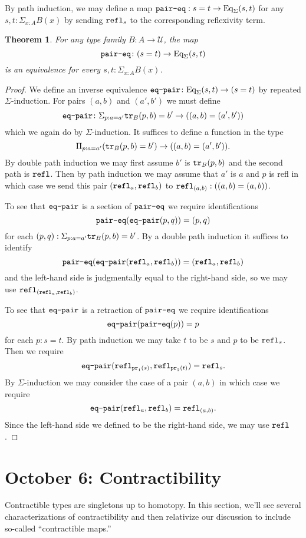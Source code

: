 \documentclass{amsart}
\theoremstyle{theorem}
\newtheorem*{thm}{Theorem}
\theoremstyle{definition}
\theoremstyle{remark}
\newcommand{\0}{\mathbbe{0}}
\newcommand{\1}{\mathbbe{1}}
\newcommand{\2}{\mathbbe{2}}
\newcommand{\3}{\mathbbe{3}}
\newcommand{\4}{\mathbbe{4}}
\newcommand{\term}[1]{{\textup{\texttt{#1}}}}
\newcommand{\pr}{\term{pr}}
\newcommand{\refl}{\term{refl}}
\newcommand{\tr}{\term{tr}}
\newcommand{\UU}{{\mathcal{U}}}
\newcommand{\Eq}{\textup{\text{Eq}}}
\begin{document}
By path induction, we may define a map $\term{pair-eq} : s =t \to \Eq_\Sigma(s,t)$ for any $s,t : \Sigma_{x:A}B(x)$ by sending $\refl_s$ to the corresponding reflexivity term.

\begin{thm} For any type family $B \colon A \to \UU$, the map
\[ \term{pair-eq} \colon (s=t) \to \Eq_\Sigma(s,t)\]
is an equivalence for every $s,t : \Sigma_{x:A}B(x)$.
\end{thm}
\begin{proof}
We define an inverse equivalence $\term{eq-pair} \colon \Eq_\Sigma(s,t) \to (s=t)$ by repeated $\Sigma$-induction. For pairs $(a,b)$ and $(a',b')$ we must define
\[ \term{eq-pair} \colon \Sigma_{p : a =a'} \tr_B(p,b)=b' \to ((a,b) = (a',b'))\]
which we again do by $\Sigma$-induction. It suffices to  define a function in the type
\[ \Pi_{p: a = a'} (\tr_B(p,b) = b') \to ((a,b)= (a',b')).\]
By double path induction we may first assume $b'$ is $\tr_B(p,b)$ and the second path is $\refl$. Then by path induction we may assume that $a'$ is $a$ and $p$ is refl in which case we send this pair $(\refl_a,\refl_b)$ to $\refl_{(a,b)} : ((a,b) = (a,b))$.

To see that $\term{eq-pair}$ is a section of $\term{pair-eq}$ we require identifications
\[ \term{pair-eq}(\term{eq-pair}(p,q)) = (p,q)\]
for each $(p,q) : \Sigma_{p : a=a'}\tr_B(p,b)=b'$. By a double path induction it suffices to identify
\[ \term{pair-eq}(\term{eq-pair}(\refl_a,\refl_b)) = (\refl_a,\refl_b)\] and the left-hand side is judgmentally equal to the right-hand side, so we may use $\refl_{(\refl_a,\refl_b)}$.

To see that  $\term{eq-pair}$ is a retraction of $\term{pair-eq}$ we require identifications
\[ \term{eq-pair}(\term{pair-eq} (p)) = p\]
for each $p : s=t$. By path induction we may take $t$ to be $s$ and $p$ to be $\refl_s$. Then we require
\[ \term{eq-pair}(\refl_{\pr_1(s)},\refl_{\pr_2(t)}) = \refl_s.\]
By $\Sigma$-induction we may consider the case of a pair $(a,b)$ in which case we require
\[ \term{eq-pair}(\refl_a,\refl_b) = \refl_{(a,b)}.\]
Since the left-hand side we defined to be the right-hand side, we may use $\refl$.
\end{proof}

\section*{October 6: Contractibility}

Contractible types are singletons up to homotopy. In this section, we'll see several characterizations of contractibility and then relativize our discussion to include so-called ``contractible maps.''
\end{document}
